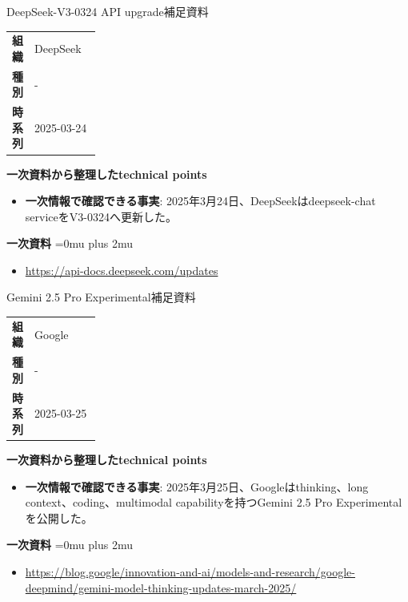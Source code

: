 \begin{technicalnote}{DeepSeek-V3-0324 API upgrade}{補足資料}
\begingroup
\begin{tabularx}{\linewidth}{@{}>{\bfseries}p{0.22\linewidth}X@{}}
組織 & DeepSeek \\
種別 & - \\
時系列 & 2025-03-24 \\
\end{tabularx}
\smallskip
{\bfseries 一次資料から整理したtechnical points}
\begin{itemize}[leftmargin=1.5em,itemsep=0.35em]
\item \textbf{一次情報で確認できる事実}: 2025年3月24日、DeepSeekはdeepseek-chat serviceをV3-0324へ更新した。
\end{itemize}
\begin{samepage}
{\bfseries 一次資料}
\begingroup\sloppy
\Urlmuskip=0mu plus 2mu\relax
\begin{itemize}[leftmargin=1.5em,itemsep=0.25em]
\item {\scriptsize\url{https://api-docs.deepseek.com/updates}}
\end{itemize}
\endgroup
\end{samepage}
\endgroup
\end{technicalnote}
\medskip

\begin{technicalnote}{Gemini 2.5 Pro Experimental}{補足資料}
\begingroup
\begin{tabularx}{\linewidth}{@{}>{\bfseries}p{0.22\linewidth}X@{}}
組織 & Google \\
種別 & - \\
時系列 & 2025-03-25 \\
\end{tabularx}
\smallskip
{\bfseries 一次資料から整理したtechnical points}
\begin{itemize}[leftmargin=1.5em,itemsep=0.35em]
\item \textbf{一次情報で確認できる事実}: 2025年3月25日、Googleはthinking、long context、coding、multimodal capabilityを持つGemini 2.5 Pro Experimentalを公開した。
\end{itemize}
\begin{samepage}
{\bfseries 一次資料}
\begingroup\sloppy
\Urlmuskip=0mu plus 2mu\relax
\begin{itemize}[leftmargin=1.5em,itemsep=0.25em]
\item {\scriptsize\url{https://blog.google/innovation-and-ai/models-and-research/google-deepmind/gemini-model-thinking-updates-march-2025/}}
\end{itemize}
\endgroup
\end{samepage}
\endgroup
\end{technicalnote}
\medskip

